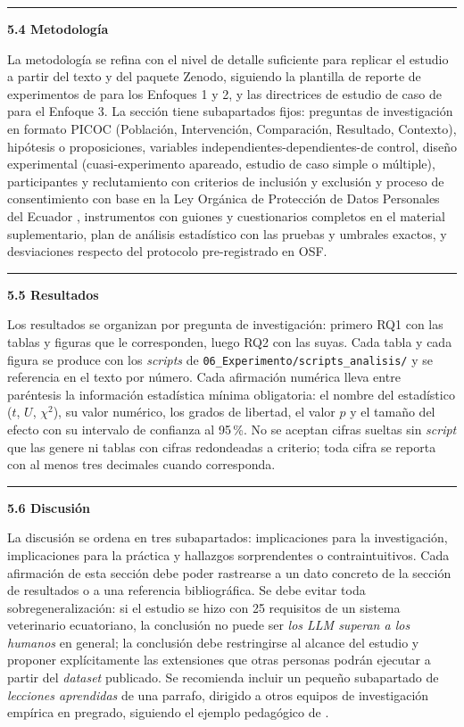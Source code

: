 \documentclass[11pt,a4paper]{article}
\newcounter{secc}
\newcommand{\submark}[1]{\par\vspace{4pt}\noindent
    {\color{uteqgreen}\rule[-1pt]{3.5pt}{12pt}}\hspace{6pt}\textbf{\color{uteqgreen}#1}\par\vspace{2pt}}
\begin{document}
\submark{5.4 Metodología}
La metodología se refina con el nivel de detalle suficiente para replicar el estudio a partir del texto y del paquete Zenodo, siguiendo la plantilla de reporte de experimentos de \cite{jedlitschka2008reporting} para los Enfoques 1 y 2, y las directrices de estudio de caso de \cite{runeson2009guidelines} para el Enfoque 3.
La sección tiene subapartados fijos: preguntas de investigación en formato PICOC (Población, Intervención, Comparación, Resultado, Contexto), hipótesis o proposiciones, variables independientes-dependientes-de control, diseño experimental (cuasi-experimento apareado, estudio de caso simple o múltiple), participantes y reclutamiento con criterios de inclusión y exclusión y proceso de consentimiento con base en la Ley Orgánica de Protección de Datos Personales del Ecuador \cite{ley_datos_ecuador_2021}, instrumentos con guiones y cuestionarios completos en el material suplementario, plan de análisis estadístico con las pruebas y umbrales exactos, y desviaciones respecto del protocolo pre-registrado en OSF.

\submark{5.5 Resultados}
Los resultados se organizan por pregunta de investigación: primero RQ1 con las tablas y figuras que le corresponden, luego RQ2 con las suyas.
Cada tabla y cada figura se produce con los \emph{scripts} de \texttt{06\_Experimento/scripts\_analisis/} y se referencia en el texto por número.
Cada afirmación numérica lleva entre paréntesis la información estadística mínima obligatoria: el nombre del estadístico ($t$, $U$, $\chi^2$), su valor numérico, los grados de libertad, el valor $p$ y el tamaño del efecto con su intervalo de confianza al 95\,\%.
No se aceptan cifras sueltas sin \emph{script} que las genere ni tablas con cifras redondeadas a criterio; toda cifra se reporta con al menos tres decimales cuando corresponda.

\submark{5.6 Discusión}
La discusión se ordena en tres subapartados: implicaciones para la investigación, implicaciones para la práctica y hallazgos sorprendentes o contraintuitivos.
Cada afirmación de esta sección debe poder rastrearse a un dato concreto de la sección de resultados o a una referencia bibliográfica.
Se debe evitar toda sobregeneralización: si el estudio se hizo con 25 requisitos de un sistema veterinario ecuatoriano, la conclusión no puede ser \emph{los LLM superan a los humanos} en general; la conclusión debe restringirse al alcance del estudio y proponer explícitamente las extensiones que otras personas podrán ejecutar a partir del \emph{dataset} publicado.
Se recomienda incluir un pequeño subapartado de \emph{lecciones aprendidas} de una parrafo, dirigido a otros equipos de investigación empírica en pregrado, siguiendo el ejemplo pedagógico de \cite{fernandez2017naming}.
\end{document}
